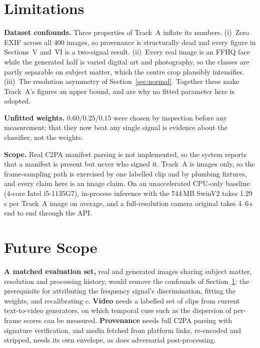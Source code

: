 \documentclass[conference]{IEEEtran}
\begin{document}
\section{Limitations}
\label{sec:limits}

\textbf{Dataset confounds.} Three properties of Track~A inflate its numbers.
(i)~Zero EXIF across all 400 images, so provenance is structurally dead and
every figure in Sections~V and~VI is a two-signal result. (ii)~Every real image
is an FFHQ face while the generated half is varied digital art and photography,
so the classes are partly separable on subject matter, which the centre crop
plausibly intensifies. (iii)~The resolution asymmetry of
Section~\ref{sec:normal}. Together these make Track~A's figures an upper bound,
and are why no fitted parameter here is adopted.

\textbf{Unfitted weights.} $0.60/0.25/0.15$ were chosen by inspection before
any measurement; that they now beat any single signal is evidence about the
classifier, not the weights.

\textbf{Scope.} Real C2PA manifest parsing is not implemented, so the system
reports that a manifest is present but never who signed it. Track~A is images
only, so the frame-sampling path is exercised by one labelled clip and by
plumbing fixtures, and every claim here is an image claim. On an unaccelerated
CPU-only baseline (4-core Intel i5-1135G7), in-process inference with the
744\,MB SwinV2 takes 1.29\,s per Track~A image on average, and a
full-resolution camera original takes 4--6\,s end to end through the API.

\section{Future Scope}
\label{sec:future}

\textbf{A matched evaluation set,} real and generated images sharing subject
matter, resolution and processing history, would remove the confounds of
Section~\ref{sec:limits}: the prerequisite for attributing the frequency
signal's discrimination, fitting the weights, and recalibrating $c$.
\textbf{Video} needs a labelled set of clips from current text-to-video
generators, on which temporal cues such as the dispersion of per-frame scores
can be measured. \textbf{Provenance} needs full C2PA parsing with signature
verification, and media fetched from platform links, re-encoded and stripped,
needs its own envelope, as does adversarial post-processing.
\end{document}
